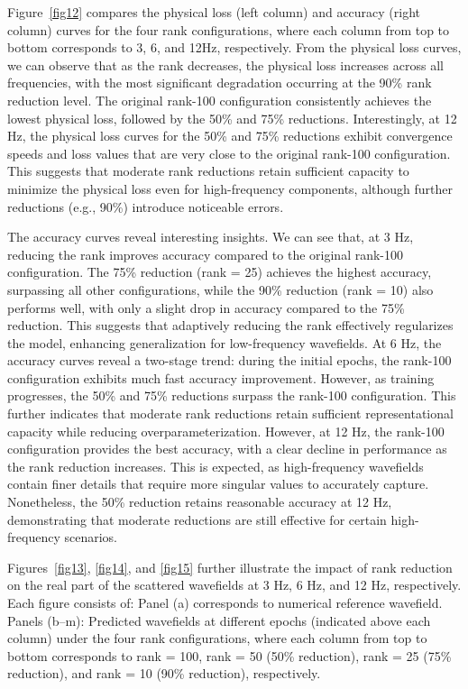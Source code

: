 Figure~\ref{fig12} compares the physical loss (left column) and accuracy (right column) curves for the four rank configurations, where each column from top to bottom corresponds to 3, 6, and 12Hz, respectively. From the physical loss curves, we can observe that as the rank decreases, the physical loss increases across all frequencies, with the most significant degradation occurring at the 90\% rank reduction level. The original rank-100 configuration consistently achieves the lowest physical loss, followed by the 50\% and 75\% reductions. Interestingly, at 12 Hz, the physical loss curves for the 50\% and 75\% reductions exhibit convergence speeds and loss values that are very close to the original rank-100 configuration. This suggests that moderate rank reductions retain sufficient capacity to minimize the physical loss even for high-frequency components, although further reductions (e.g., 90\%) introduce noticeable errors. 

The accuracy curves reveal interesting insights. We can see that, at 3 Hz, reducing the rank improves accuracy compared to the original rank-100 configuration. The 75\% reduction (rank = 25) achieves the highest accuracy, surpassing all other configurations, while the 90\% reduction (rank = 10) also performs well, with only a slight drop in accuracy compared to the 75\% reduction. This suggests that adaptively reducing the rank effectively regularizes the model, enhancing generalization for low-frequency wavefields. At 6 Hz, the accuracy curves reveal a two-stage trend: during the initial epochs, the rank-100 configuration exhibits much fast accuracy improvement. However, as training progresses, the 50\% and 75\% reductions surpass the rank-100 configuration. This further indicates that moderate rank reductions retain sufficient representational capacity while reducing overparameterization. However, at 12 Hz, the rank-100 configuration provides the best accuracy, with a clear decline in performance as the rank reduction increases. This is expected, as high-frequency wavefields contain finer details that require more singular values to accurately capture. Nonetheless, the 50\% reduction retains reasonable accuracy at 12 Hz, demonstrating that moderate reductions are still effective for certain high-frequency scenarios. 

Figures~\ref{fig13}, \ref{fig14}, and \ref{fig15} further illustrate the impact of rank reduction on the real part of the scattered wavefields at 3 Hz, 6 Hz, and 12 Hz, respectively. Each figure consists of: Panel (a) corresponds to numerical reference wavefield. Panels (b–m): Predicted wavefields at different epochs (indicated above each column) under the four rank configurations, where each column from top to bottom corresponds to rank = 100, rank = 50 (50\% reduction), rank = 25 (75\% reduction), and rank = 10 (90\% reduction), respectively. 

